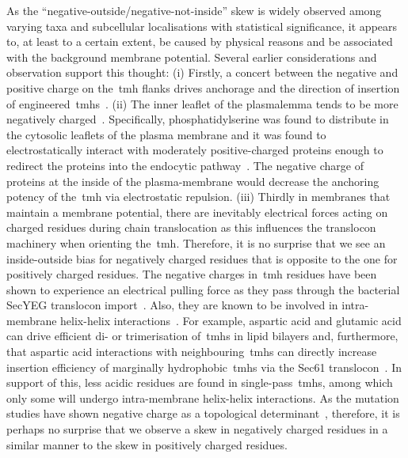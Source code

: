As the ``negative-outside/negative-not-inside'' skew is widely observed among varying taxa and subcellular localisations with statistical significance, it appears to, at least to a certain extent, be caused by physical reasons and be associated with the background membrane potential.
Several earlier considerations and observation support this thought: (i) Firstly, a concert between the negative and positive charge on the~\gls{tmh} flanks drives anchorage and the direction of insertion of engineered~\gls{tmh}s~\cite{Sipos1993, Hartmann1989}.
(ii) The inner leaflet of the plasmalemma tends to be more negatively charged~\cite{Zachowski1993}.
Specifically, phosphatidylserine was found to distribute in the cytosolic leaflets of the plasma membrane and it was found to electrostatically interact with moderately positive-charged proteins enough to redirect the proteins into the endocytic pathway~\cite{Yeung2008}.
The negative charge of proteins at the inside of the plasma-membrane would decrease the anchoring potency of the~\gls{tmh} via electrostatic repulsion.
(iii) Thirdly in membranes that maintain a membrane potential, there are inevitably electrical forces acting on charged residues during chain translocation as this influences the translocon machinery when orienting the~\gls{tmh}.
Therefore, it is no surprise that we see an inside-outside bias for negatively charged residues that is opposite to the one for positively charged residues.
The negative charges in~\gls{tmh} residues have been shown to experience an electrical pulling force as they pass through the bacterial SecYEG translocon import~\cite{Ismail2012, Ismail2015}.
Also, they are known to be involved in intra-membrane helix-helix interactions~\cite{Meindl-Beinker2006}.
For example, aspartic acid and glutamic acid can drive efficient di- or trimerisation of~\gls{tmh}s in lipid bilayers and, furthermore, that aspartic acid interactions with neighbouring~\gls{tmh}s can directly increase insertion efficiency of marginally hydrophobic~\gls{tmh}s via the Sec61 translocon~\cite{Meindl-Beinker2006}.
In support of this, less acidic residues are found in single-pass~\gls{tmh}s, among which only some will undergo intra-membrane helix-helix interactions.
As the mutation studies have shown negative charge as a topological determinant~\cite{Nilsson1990}, therefore, it is perhaps no surprise that we observe a skew in negatively charged residues in a similar manner to the skew in positively charged residues.

